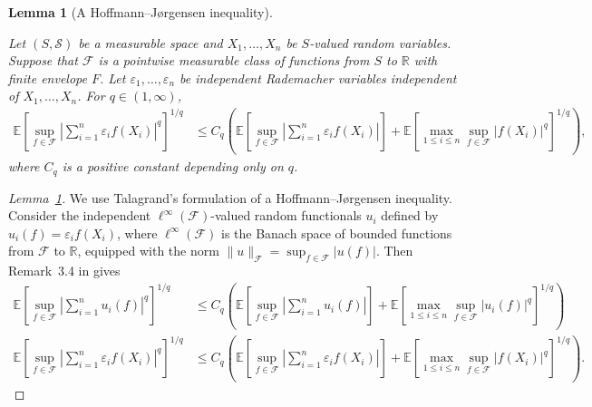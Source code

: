 \documentclass[11pt,lof]{puthesis}
\newcommand{\R}{\ensuremath{\mathbb{R}}}
\newcommand{\E}{\ensuremath{\mathbb{E}}}
\newcommand{\cF}{\ensuremath{\mathcal{F}}}
\newcommand{\cS}{\ensuremath{\mathcal{S}}}
\theoremstyle{break}
\newtheorem{lemma}{Lemma}[section]
\theoremstyle{proof}
\newtheorem{proof}{Proof}
\begin{document}
\begin{lemma}[A Hoffmann--J{\o}rgensen inequality]
  \label{lem:kernel_app_hoffmann}

  Let $(S, \cS)$ be a measurable space
  and $X_1, \ldots, X_n$
  be $S$-valued random variables.
  Suppose that
  $\cF$ is a pointwise measurable class of functions from $S$ to $\R$
  with finite envelope $F$.
  Let $\varepsilon_1, \ldots, \varepsilon_n$
  be independent Rademacher variables
  independent of $X_1, \ldots, X_n$.
  For $q \in (1, \infty)$,
  \begin{align*}
    \E \left[
      \sup_{f \in \cF}
      \left|
        \sum_{i=1}^n
        \varepsilon_i
        f(X_i)
      \right|
      ^q
    \right]
    ^{1/q}
    &\leq
    C_q
    \left(
      \E \left[
        \sup_{f \in \cF}
        \left|
          \sum_{i=1}^n
          \varepsilon_i
          f(X_i)
        \right|
      \right]
      +
      \E \left[
        \max_{1 \leq i \leq n}
        \sup_{f \in \cF}
        \big| f(X_i) \big|^q
      \right]^{1/q}
    \right),
  \end{align*}
  where $C_q$ is a positive constant depending only on $q$.

\end{lemma}

\begin{proof}[Lemma~\ref{lem:kernel_app_hoffmann}]

  We use Talagrand's formulation of
  a Hoffmann--J{\o}rgensen inequality.
  Consider the
  independent
  $\ell^\infty(\cF)$-valued
  random functionals $u_i$ defined by
  $u_i(f) = \varepsilon_i f(X_i)$,
  where $\ell^\infty(\cF)$
  is the Banach space of bounded functions from
  $\cF$ to $\R$,
  equipped with the norm
  $\|u\|_\cF = \sup_{f \in \cF} |u(f)|$.
  Then Remark~3.4 in \citet{kwapien1991hypercontraction} gives
  \begin{align*}
    \E \left[
      \sup_{f \in \cF}
      \left|
        \sum_{i=1}^n
        u_i(f)
      \right|
      ^q
    \right]
    ^{1/q}
    &\leq
    C_q
    \left(
      \E \left[
        \sup_{f \in \cF}
        \left|
          \sum_{i=1}^n
          u_i(f)
        \right|
      \right]
      +
      \E \left[
        \max_{1 \leq i \leq n}
        \sup_{f \in \cF}
        \left|
          u_i(f)
        \right|^q
      \right]^{1/q}
    \right) \\
    \E \left[
      \sup_{f \in \cF}
      \left|
        \sum_{i=1}^n
        \varepsilon_i
        f(X_i)
      \right|
      ^q
    \right]
    ^{1/q}
    &\leq
    C_q
    \left(
      \E \left[
        \sup_{f \in \cF}
        \left|
          \sum_{i=1}^n
          \varepsilon_i
          f(X_i)
        \right|
      \right]
      +
      \E \left[
        \max_{1 \leq i \leq n}
        \sup_{f \in \cF}
        \big| f(X_i) \big|^q
      \right]^{1/q}
    \right).
  \end{align*}
\end{proof}
\end{document}
